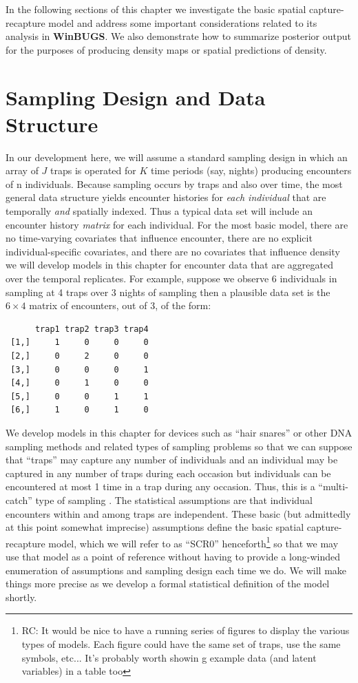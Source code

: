 In the following sections of this chapter we investigate the basic
spatial capture-recapture model and address some important
considerations related to its analysis in {\bf WinBUGS}. We also demonstrate
how to summarize posterior output for the purposes of producing
density maps or spatial predictions of density.

\section{Sampling Design and Data Structure}

In our development here, we will assume a standard sampling design in
which an array of $J$ traps is operated for $K$ time periods (say,
nights) producing encounters of n individuals.  Because sampling
occurs by traps and also over time, the most general data structure
yields encounter histories for {\it each individual} that are
temporally {\it and} spatially indexed. Thus a typical data set will
include an encounter history {\it matrix} for each individual.  For
the most basic model, there are no time-varying covariates that
influence encounter, there are no explicit individual-specific
covariates, and there are no covariates that influence density we will
develop models in this chapter for encounter data that are aggregated
over the temporal replicates. For example, suppose we observe 6
individuals in sampling at 4 traps over 3 nights of sampling then a
plausible data set is the $6 \times 4$ matrix of encounters, out of 3,
of the form:
\begin{verbatim}
      trap1 trap2 trap3 trap4 
 [1,]     1     0     0     0
 [2,]     0     2     0     0
 [3,]     0     0     0     1
 [4,]     0     1     0     0
 [5,]     0     0     1     1
 [6,]     1     0     1     0
\end{verbatim}


We develop models in this chapter for devices such as ``hair snares''
or other DNA sampling methods \citep{kery_etal:2010,
  gardner_etal:2010} and related types of sampling problems so that we
can suppose that 
``traps''  may capture any number of
individuals and an individual may be captured in any number of traps
during each occasion but 
individuals can be encountered at most 1 time in a
trap during any occasion.
Thus, this is a ``multi-catch'' type of sampling
\citep[][p. xyz]{efford:XXXX}.
The statistical assumptions
are that individual encounters within and among traps are
independent. These basic (but admittedly at this point somewhat
imprecise) assumptions define the basic spatial capture-recapture
model, which we will refer to as ``SCR0'' henceforth\footnote{RC: It
  would be nice to have a running series of figures to display the
  various types of models. Each figure could have the same set of
  traps, use the same symbols, etc... It's probably worth showin g
  example data (and latent variables) in a table too} so that we may
use that model as a point of reference without having to provide a
long-winded enumeration of assumptions and sampling design each time
we do. We will make things more precise as we develop a formal
statistical definition of the model shortly.

